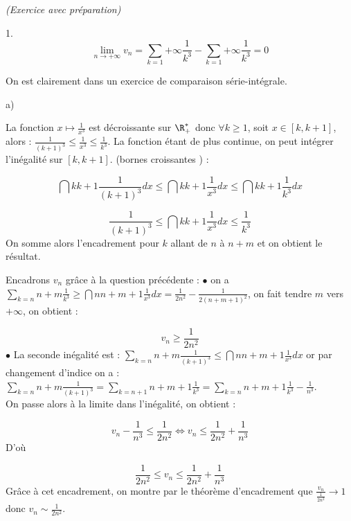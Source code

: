 \documentclass[11pt]{article}%
\begin{document}
\begin{exercice}{\it (Exercice avec préparation)}
\begin{noliste}{1.}
\[
 \lim \limits_{n \to + \infty} v_{n} = \sum \limits_{k = 1}{+ \infty}
\frac{1}{k^{3}}-\sum \limits_{k = 1}{+ \infty} \frac{1}{k^{3}} = 0 
\]
 \item On est clairement dans un exercice de comparaison
série-intégrale.
 \begin{noliste}{a)}
 \setlength{\itemsep}{2mm}
 \item La fonction $x \mapsto \frac{1}{x^{3}}$ est décroissante sur
$\R_{+}^*$ donc $\forall k \geq 1$, soit $ x \in [k, k + 1]$, alors :
$\frac{1}{(k + 1)^{3}}\leq \frac{1}{x^{3}} \leq \frac{1}{k^{3}}$. La
fonction étant de plus continue, on peut intégrer l'inégalité sur $[k,
k + 1]$. (bornes croissantes ) :
 
\[
 \dint{k}{k + 1} \frac{1}{(k + 1)^{3}}dx\leq \dint{k}{k +
1}\frac{1}{x^{3}}dx \leq\dint{k}{k + 1} \frac{1}{k^{3}}dx 
\]
 
\[
 \frac{1}{(k + 1)^{3}} \leq \dint{k}{k + 1}\frac{1}{x^{3}}dx \leq
\frac{1}{k^{3}}
\]
 On somme alors l'encadrement pour $k$ allant de $n$ à $n + m$ et on
obtient le résultat.
 \item Encadrons $v_{n}$ grâce à la question précédente : 
 $\bullet$ on a $\sum \limits_{k = n}{n + m} \frac{1}{k^{3}} \geq
\dint{n}{n + m + 1}\frac{1}{x^{3}}dx = \frac{1}{2n^{2}}-\frac{1}{2(n +
m + 1)^{2}}$, on fait tendre $m$ vers $ + \infty$, on obtient : 
 
\[
 v_{n} \geq \frac{1}{2n^{2}}
\]
 $\bullet$ La seconde inégalité est : $ \sum \limits_{k = n}{n + m}
\frac{1}{(k + 1)^{3}} \leq \dint{n}{n + m + 1}\frac{1}{x^{3}}dx$ or par
changement d'indice on a : 
 $ \sum \limits_{k = n}{n + m} \frac{1}{(k + 1)^{3}} = \sum \limits_{k
= n + 1}{n + m + 1} \frac{1}{k^{3}} = \sum \limits_{k = n}{n + m + 1}
\frac{1}{k^{3}} - \frac{1}{n^{3}}$.\\
 On passe alors à la limite dans l'inégalité, on obtient : 
 
\[
 v_{n} - \frac{1}{n^{3}} \leq \frac{1}{2n^{2}} \Leftrightarrow v_{n}
\leq \frac{1}{2n^{2}} + \frac{1}{n^{3}} 
\]
 D'où 
 
\[
 \frac{1}{2n^{2}} \leq v_{n} \leq \frac{1}{2n^{2}} + \frac{1}{n^{3}}
\]
 Grâce à cet encadrement, on montre par le théorème d'encadrement que
$\frac{v_{n}}{\frac{1}{2n^{2}}} \to 1$ donc $v_{n} \sim
\frac{1}{2n^{2}}$. 
 \end{noliste}
 \end{noliste}
 \end{exercice}
\end{document}
